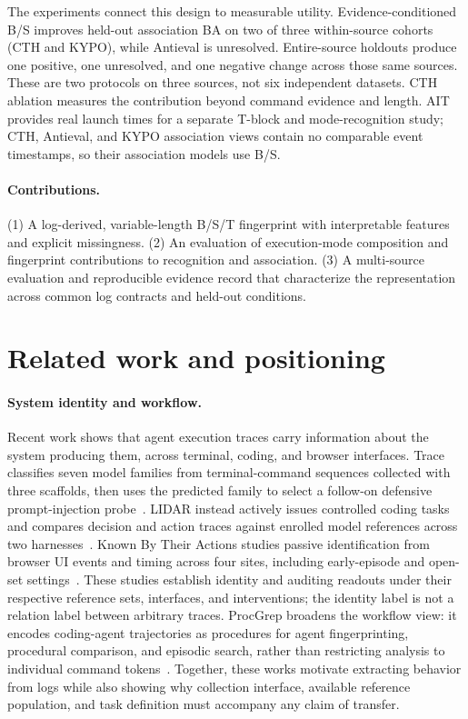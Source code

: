\documentclass[10pt]{article}
\begin{document}
The experiments connect this design to measurable utility. Evidence-conditioned B/S improves held-out association BA on two of three within-source cohorts (CTH and KYPO), while Antieval is unresolved. Entire-source holdouts produce one positive, one unresolved, and one negative change across those same sources. These are two protocols on three sources, not six independent datasets. CTH ablation measures the contribution beyond command evidence and length. AIT provides real launch times for a separate T-block and mode-recognition study; CTH, Antieval, and KYPO association views contain no comparable event timestamps, so their association models use B/S.

\paragraph{Contributions.} (1) A log-derived, variable-length B/S/T fingerprint with interpretable features and explicit missingness. (2) An evaluation of execution-mode composition and fingerprint contributions to recognition and association. (3) A multi-source evaluation and reproducible evidence record that characterize the representation across common log contracts and held-out conditions.

\section{Related work and positioning}
\paragraph{System identity and workflow.} Recent work shows that agent execution traces carry information about the system producing them, across terminal, coding, and browser interfaces. Trace classifies seven model families from terminal-command sequences collected with three scaffolds, then uses the predicted family to select a follow-on defensive prompt-injection probe~\cite{trace}. LIDAR instead actively issues controlled coding tasks and compares decision and action traces against enrolled model references across two harnesses~\cite{lidar}. Known By Their Actions studies passive identification from browser UI events and timing across four sites, including early-episode and open-set settings~\cite{known}. These studies establish identity and auditing readouts under their respective reference sets, interfaces, and interventions; the identity label is not a relation label between arbitrary traces. ProcGrep broadens the workflow view: it encodes coding-agent trajectories as procedures for agent fingerprinting, procedural comparison, and episodic search, rather than restricting analysis to individual command tokens~\cite{procgrep}. Together, these works motivate extracting behavior from logs while also showing why collection interface, available reference population, and task definition must accompany any claim of transfer.
\end{document}
